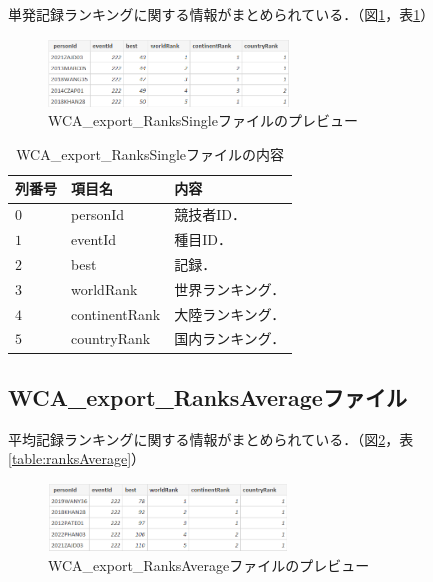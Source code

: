 \documentclass{article}
\begin{document}
  単発記録ランキングに関する情報がまとめられている．（図\ref{figure:ranksSingle}，表\ref{table:ranksSingle}）\par

  \begin{figure}[h]
    \centering
    \includegraphics[height=18mm]{ranksSingle.png}
    \caption{WCA\_export\_RanksSingleファイルのプレビュー}
    \label{figure:ranksSingle}
  \end{figure}

  \begin{table}[h]
    \centering
    \caption{WCA\_export\_RanksSingleファイルの内容}
    \label{table:ranksSingle}
    \begin{tabular}{l|l|l}
      \hline
      列番号 & 項目名 & 内容 \\
      \hline \hline
      $ 0 $ & personId & 競技者ID． \\
      $ 1 $ & eventId & 種目ID． \\
      $ 2 $ & best & 記録． \\
      $ 3 $ & worldRank & 世界ランキング． \\
      $ 4 $ & continentRank & 大陸ランキング． \\
      $ 5 $ & countryRank & 国内ランキング． \\
      \hline
    \end{tabular}
  \end{table}
	
  \subsection{WCA\_export\_RanksAverageファイル}

  平均記録ランキングに関する情報がまとめられている．（図\ref{figure:ranksAverage}，表\ref{table:ranksAverage}）\par

  \begin{figure}[h]
    \centering
    \includegraphics[height=18mm]{ranksAverage.png}
    \caption{WCA\_export\_RanksAverageファイルのプレビュー}
    \label{figure:ranksAverage}
  \end{figure}
\end{document}
